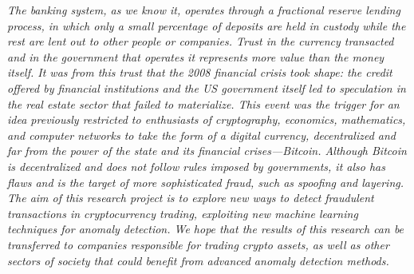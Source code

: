 \emph{The banking system, as we know it, operates through a fractional reserve lending process, in which only a small percentage of deposits are held in custody while the rest are lent out to other people or companies. Trust in the currency transacted and in the government that operates it represents more value than the money itself.
It was from this trust that the 2008 financial crisis took shape: the credit offered by financial institutions and the US government itself led to speculation in the real estate sector that failed to materialize.
This event was the trigger for an idea previously restricted to enthusiasts of cryptography, economics, mathematics, and computer networks to take the form of a digital currency, decentralized and far from the power of the state and its financial crises—Bitcoin. Although Bitcoin is decentralized and does not follow rules imposed by governments, it also has flaws and is the target of more sophisticated fraud, such as spoofing and layering.
The aim of this research project is to explore new ways to detect fraudulent transactions in cryptocurrency trading, exploiting new machine learning techniques for anomaly detection. We hope that the results of this research can be transferred to companies responsible for trading crypto assets, as well as other sectors of society that could benefit from advanced anomaly detection methods.}
